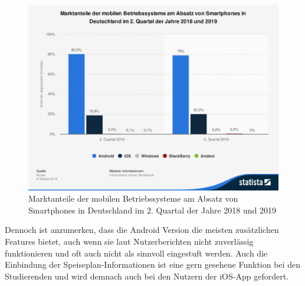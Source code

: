 \begin{figure}[h]
	\begin{center}
		\includegraphics[width=12cm]{Bilder/Statistik/Statista_SmartphoneOS.pdf}
		\caption{Marktanteile der mobilen Betriebssysteme am Absatz von Smartphones in Deutschland im 2. Quartal der Jahre 2018 und 2019\label{fig:smartphoneOS_marktanteile}\protect\footnotemark}
	\end{center}
\end{figure}


Dennoch ist anzumerken, dass die Android Version die meisten zusätzlichen Features bietet, auch wenn sie laut Nutzerberichten nicht zuverlässig funktionieren und oft auch nicht als sinnvoll eingestuft werden\autocite[Vgl.][]{umfrage}. Auch die Einbindung der Speiseplan-Informationen ist eine gern gesehene Funktion bei den Studierenden und wird demnach auch bei den Nutzern der \ac{iOS}-\ac{App} gefordert.